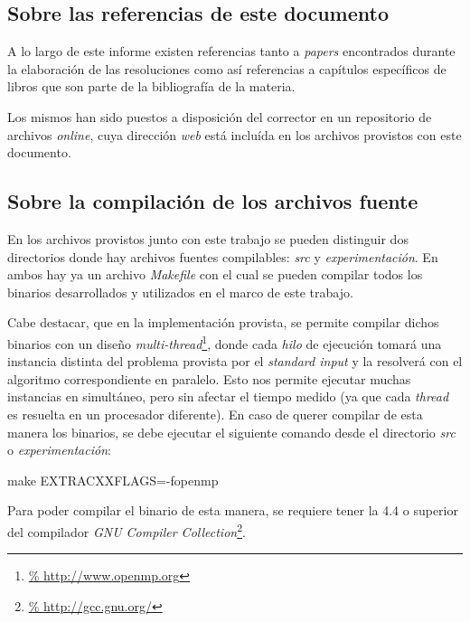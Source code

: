 {}
\subsection*{Sobre las referencias de este documento}
\par A lo largo de este informe existen referencias tanto a \emph{papers}
    encontrados durante la elaboraci\'on de las resoluciones como as\'i
    referencias a cap\'itulos espec\'ificos de libros que son parte de la
    bibliograf\'ia de la materia.

\par Los mismos han sido puestos a disposici\'on del corrector en un repositorio
    de archivos \emph{online}, cuya direcci\'on \emph{web} est\'a inclu\'ida
    en los archivos provistos con este documento.

{}
\subsection*{Sobre la compilaci\'on de los archivos fuente}
\par En los archivos provistos junto con este trabajo se pueden distinguir dos
    directorios donde hay archivos fuentes compilables: \emph{src} y
    \emph{experimentaci\'on}. En ambos hay ya un archivo \emph{Makefile} con el
    cual se pueden compilar todos los binarios desarrollados y utilizados en
    el marco de este trabajo.

\par Cabe destacar, que en la implementaci\'on provista, se permite compilar
    dichos binarios con un dise\~no \emph{multi-thread}\footnote{\url{%
    http://www.openmp.org}}, donde cada \emph{hilo} de ejecuci\'on tomar\'a
    una instancia distinta del problema provista por el \emph{standard input}
    y la resolver\'a con el algoritmo correspondiente en paralelo. Esto nos
    permite ejecutar muchas instancias en simult\'aneo, pero sin afectar
    el tiempo medido (ya que cada \emph{thread} es resuelta en un procesador
    diferente). En caso de querer compilar de esta manera los binarios, se
    debe ejecutar el siguiente comando desde el directorio \emph{src} o
    \emph{experimentaci\'on}:

\bigskip
\par make EXTRACXXFLAGS=-fopenmp
\bigskip

\par Para poder compilar el binario de esta manera, se requiere tener la 4.4
    o superior del compilador \emph{GNU Compiler Collection}\footnote{\url{%
    http://gcc.gnu.org/}}.

